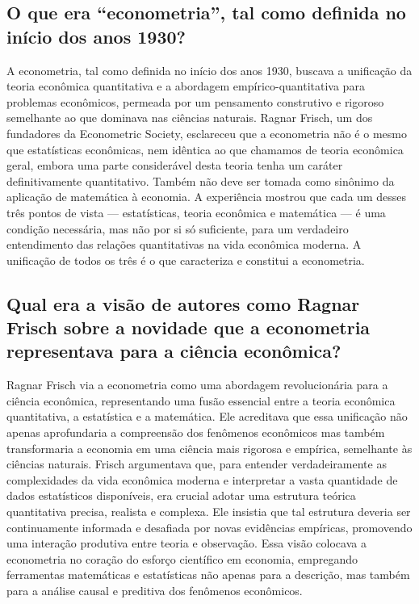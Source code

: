 \documentclass[a4paper,12pt]{article}[abntex2]
\begin{document}
\subsection{\textbf{O que era “econometria”, tal como definida no início dos anos 1930?}}
A econometria, tal como definida no início dos anos 1930, buscava a unificação da teoria econômica quantitativa e a abordagem empírico-quantitativa para problemas econômicos, permeada por um pensamento construtivo e rigoroso semelhante ao que dominava nas ciências naturais. Ragnar Frisch, um dos fundadores da Econometric Society, esclareceu que a econometria não é o mesmo que estatísticas econômicas, nem idêntica ao que chamamos de teoria econômica geral, embora uma parte considerável desta teoria tenha um caráter definitivamente quantitativo. Também não deve ser tomada como sinônimo da aplicação de matemática à economia. A experiência mostrou que cada um desses três pontos de vista — estatísticas, teoria econômica e matemática — é uma condição necessária, mas não por si só suficiente, para um verdadeiro entendimento das relações quantitativas na vida econômica moderna. A unificação de todos os três é o que caracteriza e constitui a econometria.

\subsection{\textbf{Qual era a visão de autores como Ragnar Frisch sobre a novidade que a econometria representava para a ciência econômica?}}
Ragnar Frisch via a econometria como uma abordagem revolucionária para a ciência econômica, representando uma fusão essencial entre a teoria econômica quantitativa, a estatística e a matemática. Ele acreditava que essa unificação não apenas aprofundaria a compreensão dos fenômenos econômicos mas também transformaria a economia em uma ciência mais rigorosa e empírica, semelhante às ciências naturais. Frisch argumentava que, para entender verdadeiramente as complexidades da vida econômica moderna e interpretar a vasta quantidade de dados estatísticos disponíveis, era crucial adotar uma estrutura teórica quantitativa precisa, realista e complexa. Ele insistia que tal estrutura deveria ser continuamente informada e desafiada por novas evidências empíricas, promovendo uma interação produtiva entre teoria e observação. Essa visão colocava a econometria no coração do esforço científico em economia, empregando ferramentas matemáticas e estatísticas não apenas para a descrição, mas também para a análise causal e preditiva dos fenômenos econômicos.
\end{document}
